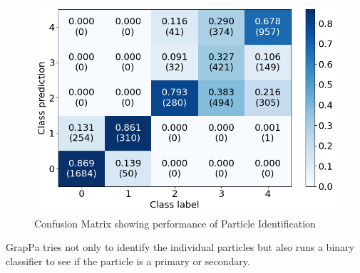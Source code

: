 \begin{figure}[H]
  \centering
  \includegraphics[width=120mm]{figures/pidPerformance.png}
  \caption{Confusion Matrix showing performance of Particle Identification}
  \label{pidPerformance}
\end{figure}

GrapPa tries not only to identify the individual particles but also runs a binary classifier to see if the particle is a primary or secondary.
